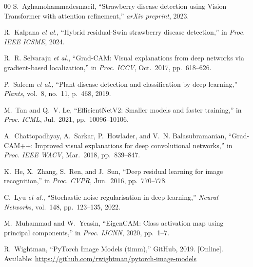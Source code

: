 \documentclass[conference]{IEEEtran}
\begin{document}
\begin{thebibliography}{00}
S.~Aghamohammadesmaeil, ``Strawberry disease detection using Vision Transformer with attention refinement,'' \textit{arXiv preprint}, 2023.

R.~Kalpana \textit{et al.}, ``Hybrid residual-Swin strawberry disease detection,'' in \textit{Proc. IEEE ICSME}, 2024.

R.~R. Selvaraju \textit{et al.}, ``Grad-CAM: Visual explanations from deep networks via gradient-based localization,'' in \textit{Proc. ICCV}, Oct.~2017, pp.~618--626.

P.~Saleem \textit{et al.}, ``Plant disease detection and classification by deep learning,'' \textit{Plants}, vol.~8, no.~11, p.~468, 2019.

M.~Tan and Q.~V. Le, ``EfficientNetV2: Smaller models and faster training,'' in \textit{Proc. ICML}, Jul.~2021, pp.~10096--10106.

A.~Chattopadhyay, A.~Sarkar, P.~Howlader, and V.~N. Balasubramanian, ``Grad-CAM++: Improved visual explanations for deep convolutional networks,'' in \textit{Proc. IEEE WACV}, Mar.~2018, pp.~839--847.

K.~He, X.~Zhang, S.~Ren, and J.~Sun, ``Deep residual learning for image recognition,'' in \textit{Proc. CVPR}, Jun.~2016, pp.~770--778.

C.~Lyu \textit{et al.}, ``Stochastic noise regularisation in deep learning,'' \textit{Neural Networks}, vol.~148, pp.~123--135, 2022.

M.~Muhammad and W.~Yeasin, ``EigenCAM: Class activation map using principal components,'' in \textit{Proc. IJCNN}, 2020, pp.~1--7.

R.~Wightman, ``PyTorch Image Models (timm),'' GitHub, 2019. [Online]. Available: \url{https://github.com/rwightman/pytorch-image-models}

\end{thebibliography}
\end{document}
